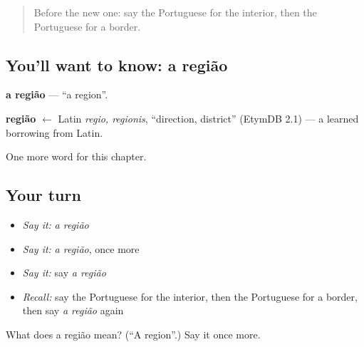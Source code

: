 \begin{quote}
Before the new one: say the Portuguese for the interior, then the Portuguese for a border.
\end{quote}

\subsection*{You'll want to know: a região}
\textbf{a região} — \textquotedblleft{}a region\textquotedblright{}.

\begin{cousinweb}
\textbf{região} $\leftarrow$ Latin \emph{regio, regionis}, \textquotedblleft{}direction, district\textquotedblright{} (EtymDB 2.1) — a learned borrowing from Latin.
\end{cousinweb}

\begin{grammarlens}[title={What you've built}]
One more word for this chapter.
\end{grammarlens}

\subsection*{Your turn}
\begin{itemize}
\raggedright
  \item \emph{Say it:} \emph{a região}
  \item \emph{Say it:} \emph{a região}, once more
  \item \emph{Say it:} say \emph{a região}
  \item \emph{Recall:} say the Portuguese for the interior, then the Portuguese for a border, then say \emph{a região} again
\end{itemize}

\begin{tcolorbox}[breakable,colback=teal!4,colframe=teal!35!black,title={Before you move on}]
What does a região mean? (\textquotedblleft{}A region\textquotedblright{}.) Say it once more.
\end{tcolorbox}
